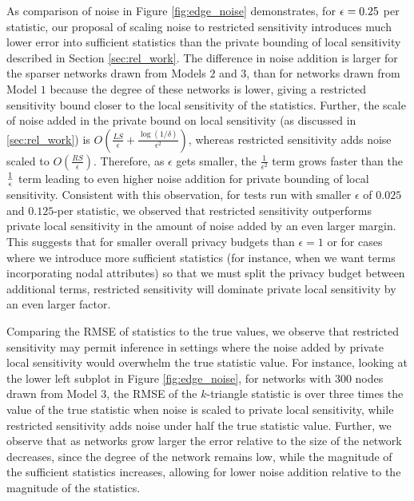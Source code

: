 As comparison of noise in Figure \ref{fig:edge_noise} demonstrates, for $\epsilon = 0.25$ per statistic, our proposal of scaling noise to restricted sensitivity introduces much lower error into sufficient statistics than the private bounding of local sensitivity described in Section \ref{sec:rel_work}. The difference in noise addition is larger for the sparser networks drawn from Models $2$ and $3$, than for networks drawn from Model $1$ because the degree of these networks is lower, giving a restricted sensitivity bound closer to the local sensitivity of the statistics. Further, the scale of noise added in the private bound on local sensitivity (as discussed in \ref{sec:rel_work}) is $O\left(\frac{LS}{\epsilon} + \frac{\log(1/\delta)}{\epsilon^2}\right)$, whereas restricted sensitivity adds noise scaled to $O\left(\frac{RS}{\epsilon}\right)$. Therefore, as $\epsilon$ gets smaller, the $\frac{1}{\epsilon^2}$ term grows faster than the $\frac{1}{\epsilon}$ term leading to even higher noise addition for private bounding of local sensitivity. Consistent with this observation, for tests run with smaller $\epsilon$ of $0.025$ and $0.125$-per statistic, we observed that restricted sensitivity outperforms private local sensitivity in the amount of noise added by an even larger margin. This suggests that for smaller overall privacy budgets than $\epsilon=1$ or for cases where we introduce more sufficient statistics (for instance, when we want terms incorporating nodal attributes) so that we must split the privacy budget between additional terms, restricted sensitivity will dominate private local sensitivity by an even larger factor.

Comparing the RMSE of statistics to the true values, we observe that restricted sensitivity may permit inference in settings where the noise added by private local sensitivity would overwhelm the true statistic value. For instance, looking at the lower left subplot in Figure \ref{fig:edge_noise}, for networks with $300$ nodes drawn from Model $3$, the RMSE of the $k$-triangle statistic is over three times the value of the true statistic when noise is scaled to private local sensitivity, while restricted sensitivity adds noise under half the true statistic value. Further, we observe that as networks grow larger the error relative to the size of the network decreases, since the degree of the network remains low, while the magnitude of the sufficient statistics increases, allowing for lower noise addition relative to the magnitude of the statistics.

